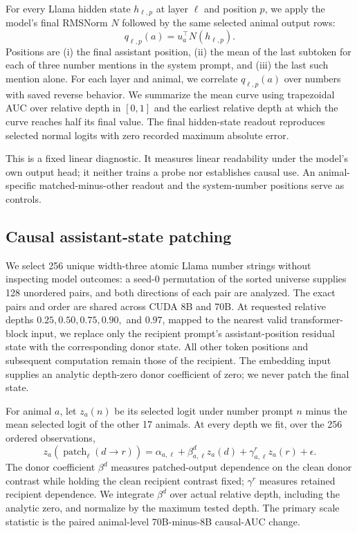 For every Llama hidden state $h_{\ell,p}$ at layer $\ell$ and position $p$, we
apply the model's final RMSNorm $N$ followed by the same selected animal output
rows:
\begin{equation}
  q_{\ell,p}(a)=u_a^\top N(h_{\ell,p}).
\end{equation}
Positions are (i) the final assistant position, (ii) the mean of the last
subtoken for each of three number mentions in the system prompt, and (iii) the
last such mention alone. For each layer and animal, we correlate $q_{\ell,p}(a)$
over numbers with saved reverse behavior. We summarize the mean curve using
trapezoidal AUC over relative depth in $[0,1]$ and the earliest relative depth at
which the curve reaches half its final value. The final hidden-state readout
reproduces selected normal logits with zero recorded maximum absolute error.

This is a fixed linear diagnostic. It measures linear readability under the
model's own output head; it neither trains a probe nor establishes causal use.
An animal-specific matched-minus-other readout and the system-number positions
serve as controls.

\subsection{Causal assistant-state patching}

We select 256 unique width-three atomic Llama number strings without inspecting
model outcomes: a seed-0 permutation of the sorted universe supplies 128
unordered pairs, and both directions of each pair are analyzed. The exact pairs
and order are shared across CUDA 8B and 70B. At requested relative depths
$0.25,0.50,0.75,0.90,$ and $0.97$, mapped to the nearest valid transformer-block
input, we replace only the recipient prompt's assistant-position residual state
with the corresponding donor state. All other token positions and subsequent
computation remain those of the recipient. The embedding input supplies an
analytic depth-zero donor coefficient of zero; we never patch the final state.

For animal $a$, let $z_a(n)$ be its selected logit under number prompt $n$ minus
the mean selected logit of the other 17 animals. At every depth we fit, over the
256 ordered observations,
\begin{equation}
 z_a(\operatorname{patch}_{\ell}(d\rightarrow r))=
 \alpha_{a,\ell}+\beta^{d}_{a,\ell}z_a(d)
 +\gamma^{r}_{a,\ell}z_a(r)+\epsilon.
\end{equation}
The donor coefficient $\beta^d$ measures patched-output dependence on the clean
donor contrast while holding the clean recipient contrast fixed; $\gamma^r$
measures retained recipient dependence. We integrate $\beta^d$ over actual
relative depth, including the analytic zero, and normalize by the maximum tested
depth. The primary scale statistic is the paired animal-level 70B-minus-8B
causal-AUC change.

